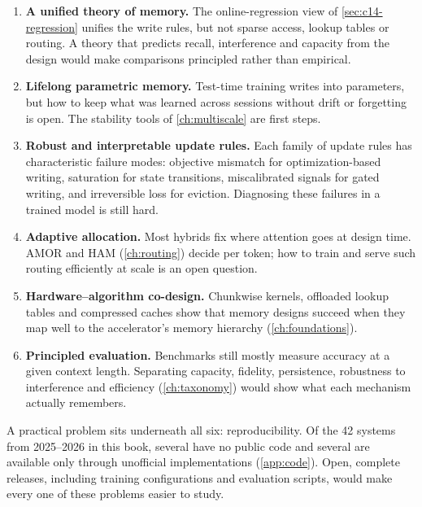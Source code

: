 \begin{enumerate}
  \item \textbf{A unified theory of memory.} The online-regression view of
    \cref{sec:c14-regression} unifies the write rules, but not sparse access, lookup tables or
    routing. A theory that predicts recall, interference and capacity from the design would
    make comparisons principled rather than empirical.
  \item \textbf{Lifelong parametric memory.} Test-time training writes into parameters, but
    how to keep what was learned across sessions without drift or forgetting is open. The
    stability tools of \cref{ch:multiscale} are first steps.
  \item \textbf{Robust and interpretable update rules.} Each family of update rules has
    characteristic failure modes: objective mismatch for optimization-based writing,
    saturation for state transitions, miscalibrated signals for gated writing, and
    irreversible loss for eviction. Diagnosing these failures in a trained model is still
    hard.
  \item \textbf{Adaptive allocation.} Most hybrids fix where attention goes at design time.
    AMOR and HAM (\cref{ch:routing}) decide per token; how to train and serve such routing
    efficiently at scale is an open question.
  \item \textbf{Hardware--algorithm co-design.} Chunkwise kernels, offloaded lookup tables
    and compressed caches show that memory designs succeed when they map well to the
    accelerator's memory hierarchy (\cref{ch:foundations}).
  \item \textbf{Principled evaluation.} Benchmarks still mostly measure accuracy at a given
    context length. Separating capacity, fidelity, persistence, robustness to interference
    and efficiency (\cref{ch:taxonomy}) would show what each mechanism actually remembers.
\end{enumerate}

A practical problem sits underneath all six: reproducibility. Of the 42 systems from
2025--2026 in this book, several have no public code and several are available only through
unofficial implementations (\cref{app:code}). Open, complete releases, including training
configurations and evaluation scripts, would make every one of these problems easier to
study.

